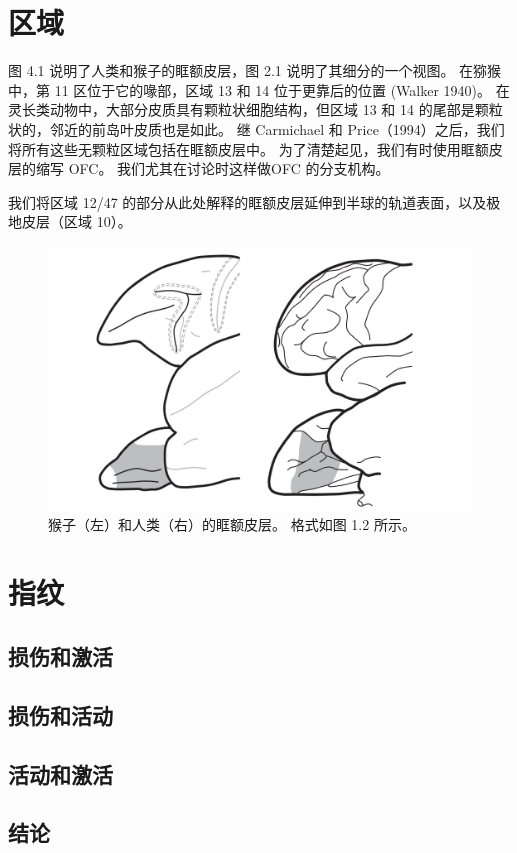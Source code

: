 \section{区域}
图 4.1 说明了人类和猴子的眶额皮层，图 2.1 说明了其细分的一个视图。 在猕猴中，第 11 区位于它的喙部，区域 13 和 14 位于更靠后的位置 (Walker 1940)。 在灵长类动物中，大部分皮质具有颗粒状细胞结构，但区域 13 和 14 的尾部是颗粒状的，邻近的前岛叶皮质也是如此。 继 Carmichael 和 Price（1994）之后，我们将所有这些无颗粒区域包括在眶额皮层中。 为了清楚起见，我们有时使用眶额皮层的缩写 OFC。 我们尤其在讨论时这样做OFC 的分支机构。\par
我们将区域 12/47 的部分从此处解释的眶额皮层延伸到半球的轨道表面，以及极地皮层（区域 10）。
\begin{figure}[!htb]
	\centering
	\includegraphics{image_pfc/Fig_4_1}
	\caption{猴子（左）和人类（右）的眶额皮层。 格式如图 1.2 所示。}
	\label{fig:fig}
\end{figure}


\section{指纹}

\subsection{损伤和激活}

\subsection{损伤和活动}

\subsection{活动和激活}




\subsection{结论}


